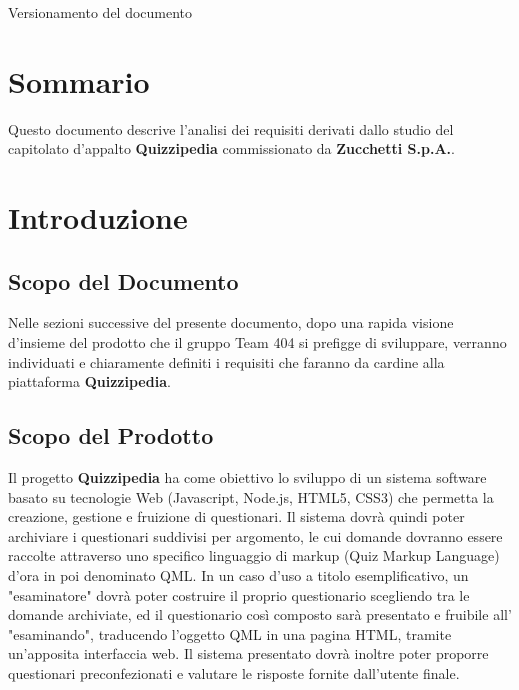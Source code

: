 \documentclass[a4paper,11pt]{article}
\begin{document}
			\caption{Versionamento del documento} 
		\fineregistro
	\newpage
	\fancyhead[R]{\leftmark}
	\tableofcontents
	\newpage
	\listoffigures	
	\listoftables
	\newpage
	
	\renewcommand{\arraystretch}{2}
	\section*{Sommario}
	Questo documento descrive l’analisi dei requisiti derivati dallo studio del capitolato d’appalto \textbf{Quizzipedia} commissionato da \textbf{Zucchetti S.p.A.}.
	
	\newpage
	\section{Introduzione}
	\subsection{Scopo del Documento}
	Nelle sezioni successive del presente documento, dopo una rapida visione d'insieme del prodotto che il gruppo Team 404 si prefigge di sviluppare, verranno individuati e chiaramente definiti i requisiti che faranno da cardine alla piattaforma \textbf{Quizzipedia}.
	\subsection{Scopo del Prodotto}
	Il progetto \textbf{Quizzipedia} ha come obiettivo lo sviluppo di un sistema software basato su tecnologie Web (Javascript, Node.js, HTML5, CSS3) che permetta la creazione, gestione e fruizione di questionari. Il sistema dovrà quindi poter archiviare i questionari suddivisi per argomento, le cui domande dovranno essere raccolte attraverso uno specifico linguaggio di markup (Quiz Markup Language) d'ora in poi denominato QML. In un caso d'uso a titolo esemplificativo, un "esaminatore" dovrà poter costruire il proprio questionario scegliendo tra le domande archiviate, ed il questionario così composto sarà presentato e fruibile all' "esaminando", traducendo l'oggetto QML in una pagina HTML, tramite un'apposita interfaccia web. Il sistema presentato dovrà inoltre poter proporre questionari preconfezionati e valutare le risposte fornite dall'utente finale.
\end{document}
